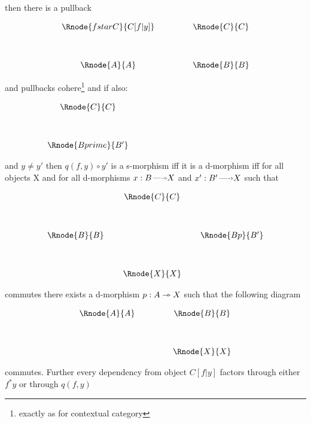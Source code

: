\documentclass[10pt,a4paper]{scrartcl}
\begin{document}
\begin{enumerate} [A.,leftmargin=0.5cm]
then there is a pullback 
\vspace{3mm}
\begin{center}
\begin{displaymath}
\begin{array}{cp{.9cm}c}
\Rnode{fstarC}{C[f|y]} & & \Rnode{C}{C}\\ [1.2cm]
\Rnode{A}{A}         & & \Rnode{B}{B}
\end{array}
\end{displaymath}
\end{center}
and pullbacks cohere\footnote{exactly as for contextual category}
and if also:
\begin{center}
$
\begin{array}{cp{.9cm}c}
            & & \Rnode{C}{C} \\ [1.2cm]
& & \Rnode{Bprime}{B'} \\
\end{array}
$
\end{center}
and $y \neq y'$ then $q(f,y) \circ y'$ is a s-morphism iff it is a d-morphism iff for all objects X and for all d-morphisms $x:B \dmorph X$ and 
$x':B' \dmorph X$ such that
\begin{center}
\begin{displaymath}
\begin{array}{cp{0.1cm}cp{0.1cm}c}   
  & & \Rnode{C}{C} \\    [1.2cm] 
 \Rnode{B}{B} & & &&\Rnode{Bp}{B'}\\ [1.2cm]
  & & \Rnode{X}{X} \\
\end{array}
\end{displaymath}
\end{center}
commutes there exists a d-morphism $p:A \rightarrowtriangle X$ such that the following diagram 
\begin{center}
\begin{displaymath}
\begin{array}{cp{.9cm}c}
          
\Rnode{A}{A}& & \Rnode{B}{B} \\ [1.2cm]
  & & \Rnode{X}{X} \\
\end{array}
\end{displaymath}
\end{center}
commutes. Further every dependency from object $C[f|y]$ factors through either $f^*y$ or through $q(f,y)$
  

\end{enumerate}
\end{document}
